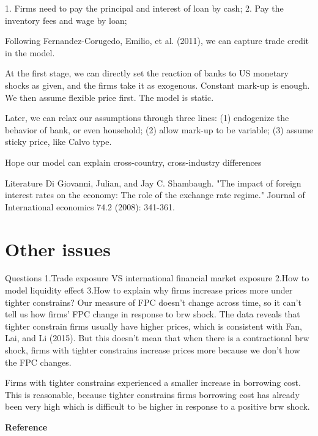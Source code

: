 \documentclass[12pt]{article}
\begin{document}
1.	Firms need to pay the principal and interest of loan by cash;
2.	Pay the inventory fees and wage by loan;

Following Fernandez-Corugedo, Emilio, et al. (2011), we can capture trade credit in the model.


At the first stage, we can directly set the reaction of banks to US monetary shocks as given, and the firms take it as exogenous. Constant mark-up is enough. We then assume flexible price first. The model is static.

 

Later, we can relax our assumptions through three lines: (1) endogenize the behavior of bank, or even household; (2) allow mark-up to be variable; (3) assume sticky price, like Calvo type.

Hope our model can explain cross-country, cross-industry differences






Literature
Di Giovanni, Julian, and Jay C. Shambaugh. "The impact of foreign interest rates on the economy: The role of the exchange rate regime." Journal of International economics 74.2 (2008): 341-361.


\section{Other issues}
Questions
1.Trade exposure VS international financial market exposure
2.How to model liquidity effect
3.How to explain why firms increase prices more under tighter constrains?
Our measure of FPC doesn’t change across time, so it can’t tell us how firms’ FPC change in response to brw shock. The data reveals that tighter constrain firms usually have higher prices, which is consistent with Fan, Lai, and Li (2015). But this doesn’t mean that when there is a contractional brw shock, firms with tighter constrains increase prices more because we don’t how the FPC changes.
 
 

Firms with tighter constrains experienced a smaller increase in borrowing cost. This is reasonable, because tighter constrains firms borrowing cost has already been very high which is difficult to be higher in response to a positive brw shock.

\newpage
{\textbf{Reference}} 

\end{document}
